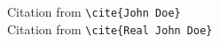\documentclass[12pt]{article}
\begin{document}
Citation from \verb|\cite{John Doe}| \cite{John_Doe}\\
Citation from \verb|\cite{Real John Doe}| \cite{Real_John_Doe}

\printbibliography
\end{document}
